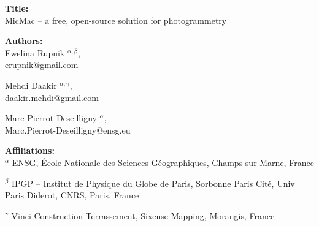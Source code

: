 \documentclass[12pt]{article}
\begin{document}
\textbf{Title:}\\
\noindent
{MicMac -- a free, open-source solution for photogrammetry}

\vspace{0.5cm}

\textbf{Authors:}\\
\noindent
Ewelina Rupnik $^{\alpha, \beta}$, \\
erupnik@gmail.com

\vspace{0.5cm}

\noindent
Mehdi Daakir $^{\alpha , \gamma}$, \\daakir.mehdi@gmail.com

\vspace{0.5cm}

\noindent
Marc Pierrot Deseilligny $^\alpha$, \\Marc.Pierrot-Deseilligny@ensg.eu

\vspace{2cm}
 
\textbf{Affiliations:}\\ 
\noindent
$^\alpha${%
  {ENSG, \'Ecole Nationale des Sciences G\'eographiques}, %
  {Champs-sur-Marne},                              %
  {France}                                    %
}

\noindent
$^\beta${%
  {IPGP -- Institut de Physique du Globe de Paris, Sorbonne Paris Cit\'e, Univ Paris Diderot, CNRS}, %
  {Paris},                              %
  {France}                                    %
} 

\noindent
$^\gamma${%
  {Vinci-Construction-Terrassement, Sixense Mapping}, 
  {Morangis},
  {France}
}
  
\end{document}
